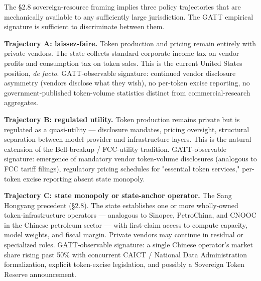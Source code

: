 \documentclass[11pt,a4paper]{article}
\begin{document}
The §2.8 sovereign-resource framing implies three policy trajectories that are mechanically available to any sufficiently large jurisdiction. The GATT empirical signature is sufficient to discriminate between them.

\textbf{Trajectory A: laissez-faire.} Token production and pricing remain entirely with private vendors. The state collects standard corporate income tax on vendor profits and consumption tax on token sales. This is the current United States position, \emph{de facto}. GATT-observable signature: continued vendor disclosure asymmetry (vendors disclose what they wish), no per-token excise reporting, no government-published token-volume statistics distinct from commercial-research aggregates.

\textbf{Trajectory B: regulated utility.} Token production remains private but is regulated as a quasi-utility --- disclosure mandates, pricing oversight, structural separation between model-provider and infrastructure layers. This is the natural extension of the Bell-breakup / FCC-utility tradition. GATT-observable signature: emergence of mandatory vendor token-volume disclosures (analogous to FCC tariff filings), regulatory pricing schedules for "essential token services," per-token excise reporting absent state monopoly.

\textbf{Trajectory C: state monopoly or state-anchor operator.} The Sang Hongyang precedent (§2.8). The state establishes one or more wholly-owned token-infrastructure operators --- analogous to Sinopec, PetroChina, and CNOOC in the Chinese petroleum sector --- with first-claim access to compute capacity, model weights, and fiscal margin. Private vendors may continue in residual or specialized roles. GATT-observable signature: a single Chinese operator's market share rising past 50\% with concurrent CAICT / National Data Administration formalization, explicit token-excise legislation, and possibly a Sovereign Token Reserve announcement.
\end{document}
